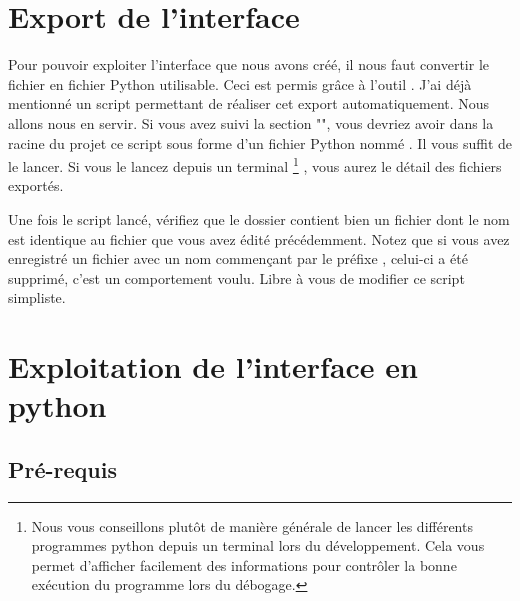 
\section{Export de l'interface}

Pour pouvoir exploiter l'interface que nous avons créé, il nous faut convertir le fichier  en fichier Python utilisable.\newline
Ceci est permis grâce à l'outil .\newline
J'ai déjà mentionné un script permettant de réaliser cet export automatiquement. Nous allons nous en servir. Si vous avez suivi la section "", vous devriez avoir dans la racine du projet ce script sous forme d'un fichier Python nommé . Il vous suffit de le lancer. Si vous le lancez depuis un terminal
\footnote
{
Nous vous conseillons plutôt de manière générale de lancer les différents programmes python depuis un terminal lors du développement. Cela vous permet d'afficher facilement des informations pour contrôler la bonne exécution du programme lors du débogage.
}
, vous aurez le détail des fichiers exportés.\newline


Une fois le script lancé, vérifiez que le dossier  contient bien un fichier dont le nom est identique au fichier  que vous avez édité précédemment. Notez que si vous avez enregistré un fichier avec un nom commençant par le préfixe , celui-ci a été supprimé, c'est un comportement voulu. Libre à vous de modifier ce script simpliste.



\section{Exploitation de l'interface en python}

\subsection{Pré-requis}

